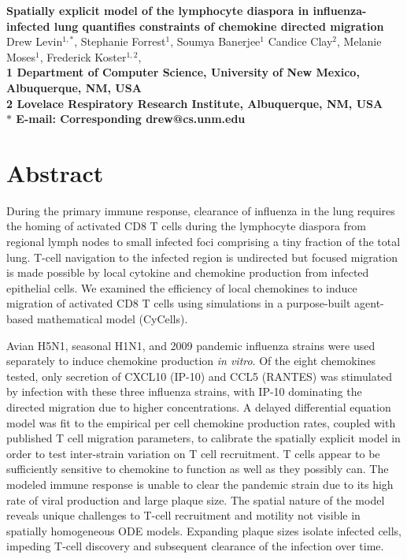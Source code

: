 \documentclass[10pt]{article}
\date{}
\begin{document}
\begin{flushleft}
{\Large
\textbf{Spatially explicit model of the lymphocyte diaspora in influenza-infected lung quantifies constraints of chemokine directed migration}
}
\\
Drew Levin$^{1,\ast}$, 
Stephanie Forrest$^{1}$, 
Soumya Banerjee$^{1}$
Candice Clay$^{2}$, 
Melanie Moses$^{1}$, 
Frederick Koster$^{1,2}$, 
\\
\bf{1} Department of Computer Science, University of New Mexico, Albuquerque, NM, USA
\\
\bf{2} Lovelace Respiratory Research Institute, Albuquerque, NM, USA
\\
$\ast$ E-mail: Corresponding drew@cs.unm.edu
\end{flushleft}



\section*{Abstract}

During the primary immune response, clearance of influenza in the lung requires the homing of activated CD8 T cells during the lymphocyte diaspora from regional lymph nodes to small infected foci comprising a tiny fraction of the total lung.  T-cell navigation to the infected region is undirected but focused migration is made possible by local cytokine and chemokine production from infected epithelial cells.  We examined the efficiency of local chemokines to induce migration of activated CD8 T cells using simulations in a purpose-built agent-based mathematical model (CyCells).  

Avian H5N1, seasonal H1N1, and 2009 pandemic influenza strains were used separately to induce chemokine production \textit{in vitro}.  Of the eight chemokines tested, only secretion of CXCL10 (IP-10) and CCL5 (RANTES) was stimulated by infection with these three influenza strains, with IP-10 dominating the directed migration due to higher concentrations.  A delayed differential equation model was fit to the empirical per cell chemokine production rates, coupled with published T cell migration parameters, to calibrate the spatially explicit model in order to test inter-strain variation on T cell recruitment.  T cells appear to be sufficiently sensitive to chemokine to function as well as they possibly can.  The modeled immune response is unable to clear the pandemic strain due to its high rate of viral production and large plaque size.  The spatial nature of the model reveals unique challenges to T-cell recruitment and motility not visible in spatially homogeneous ODE models.  Expanding plaque sizes isolate infected cells, impeding T-cell discovery and subsequent clearance of the infection over time.  
\end{document}
